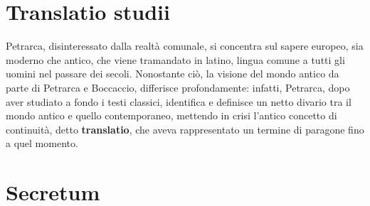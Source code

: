 \documentclass[10pt,a4paper]{article}
\begin{document}
\section{Translatio studii}

Petrarca, disinteressato dalla realtà comunale, si concentra sul sapere europeo, sia moderno che antico, che viene tramandato in latino, lingua comune a tutti gli uomini nel passare dei secoli. Nonostante ciò, la visione del mondo antico da parte di Petrarca e Boccaccio, differisce profondamente: infatti, Petrarca, dopo aver studiato a fondo i testi classici, identifica e definisce un netto divario tra il mondo antico e quello contemporaneo, mettendo in crisi l'antico concetto di continuità, detto \textbf{translatio}, che aveva rappresentato un termine di paragone fino a quel momento. 

\section{Secretum}
\end{document}
